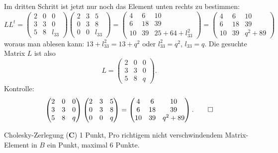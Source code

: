 \begin{loesung}
Im dritten Schritt ist jetzt nur noch das Element unten rechts zu bestimmen:
\[
LL^t=
\begin{pmatrix}
2&0&     0\\
3&3&     0\\
5&8&l_{33}
\end{pmatrix}
\begin{pmatrix}
2&3&     5\\
0&3&     8\\
0&0&l_{33}
\end{pmatrix}
=
\begin{pmatrix}
 4& 6& 10\\
 6&18& 39\\
10&39& 25+64+l_{33}^2
\end{pmatrix}
=
\begin{pmatrix}
 4& 6&10\\
 6&18&39\\
10&39& q^2 + 89
\end{pmatrix}
\]
woraus man ablesen kann: $13+l_{33}^2=13+q^2$ oder $l_{33}^2=q^2$, $l_{33}=q$.
Die gesuchte Matrix $L$ ist also
\[
L=
\begin{pmatrix}
2&0&0\\
3&3&0\\
5&8&q
\end{pmatrix}.
\]
Kontrolle:
\[
\begin{pmatrix}
2&0&0\\
3&3&0\\
5&8&q
\end{pmatrix}
\begin{pmatrix}
2&3&5\\
0&3&8\\
0&0&q
\end{pmatrix}
=
\begin{pmatrix}
 4& 6&10\\
 6&18&39\\
10&39&q^2 + 89
\end{pmatrix}.
\qedhere
\]
\end{loesung}

\begin{bewertung}
Cholesky-Zerlegung ({\bf C}) 1 Punkt,
Pro richtigem nicht verschwindendem Matrix-Element in $B$ ein Punkt,
maximal 6 Punkte.
\end{bewertung}

